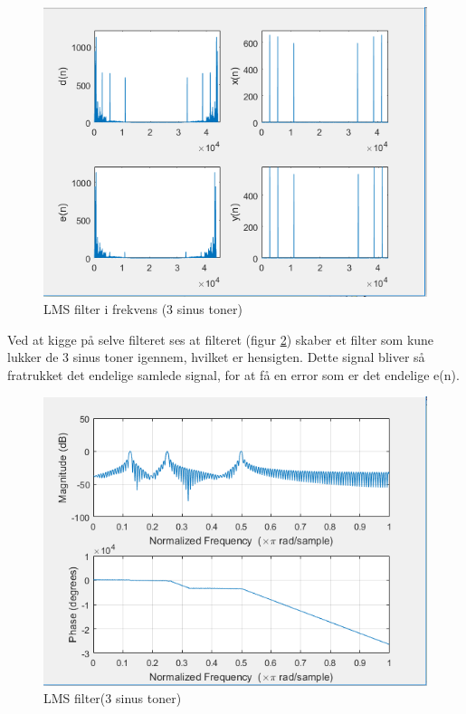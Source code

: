 \begin{figure}[H]
	\centering
	\includegraphics[width = 400pt]{Img/Filter_Freq}
	\caption{LMS filter i frekvens (3 sinus toner)}
	\label{fig:Filter_Freq}
\end{figure}
\newpage
Ved at kigge på selve filteret ses at filteret (figur \ref{fig:Filter}) skaber et filter som kune lukker de 3 sinus toner igennem, hvilket er hensigten. Dette signal bliver så fratrukket det endelige samlede signal, for at få en error som er det endelige e(n). 
\begin{figure}[H]
	\centering
	\includegraphics[width = 400pt]{Img/Filter}
	\caption{LMS filter(3 sinus toner)}
	\label{fig:Filter}
\end{figure}
\newpage
